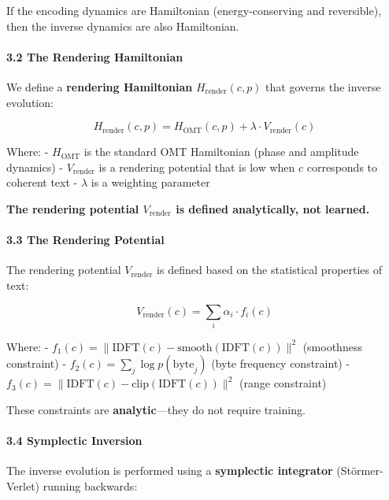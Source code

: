 \documentclass[
  11pt,
  a4paper,
]{article}
\begin{document}
If the encoding dynamics are Hamiltonian (energy-conserving and
reversible), then the inverse dynamics are also Hamiltonian.

\paragraph{3.2 The Rendering
Hamiltonian}\label{the-rendering-hamiltonian}

We define a \textbf{rendering Hamiltonian} \(H_{\text{render}}(c, p)\)
that governs the inverse evolution:

\[
H_{\text{render}}(c, p) = H_{\text{OMT}}(c, p) + \lambda \cdot V_{\text{render}}(c)
\]

Where: - \(H_{\text{OMT}}\) is the standard OMT Hamiltonian (phase and
amplitude dynamics) - \(V_{\text{render}}\) is a rendering potential
that is low when \(c\) corresponds to coherent text - \(\lambda\) is a
weighting parameter

\textbf{The rendering potential \(V_{\text{render}}\) is defined
analytically, not learned.}

\paragraph{3.3 The Rendering Potential}\label{the-rendering-potential}

The rendering potential \(V_{\text{render}}\) is defined based on the
statistical properties of text:

\[
V_{\text{render}}(c) = \sum_i \alpha_i \cdot f_i(c)
\]

Where: -
\(f_1(c) = \|\text{IDFT}(c) - \text{smooth}(\text{IDFT}(c))\|^2\)
(smoothness constraint) - \(f_2(c) = \sum_j \log p(\text{byte}_j)\)
(byte frequency constraint) -
\(f_3(c) = \|\text{IDFT}(c) - \text{clip}(\text{IDFT}(c))\|^2\) (range
constraint)

These constraints are \textbf{analytic}---they do not require training.

\paragraph{3.4 Symplectic Inversion}\label{symplectic-inversion}

The inverse evolution is performed using a \textbf{symplectic
integrator} (Störmer-Verlet) running backwards:
\end{document}
